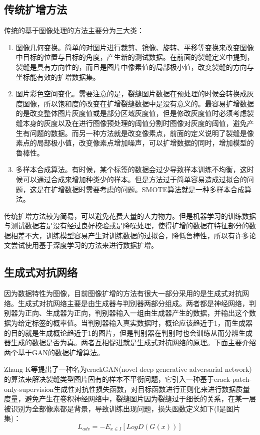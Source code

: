 \documentclass[a4paper,UTF8]{article}
\theoremstyle{definition}
\begin{document}
    \subsection{传统扩增方法}
    传统的基于图像处理的方法主要分为三大类：
    \begin{enumerate}[(1)]
    	\item 图像几何变换。简单的对图片进行裁剪、镜像、旋转、平移等变换来改变图像中目标的位置与目标的角度，产生新的测试数据。在前面的裂缝定义中提到，裂缝是具有方向性的，而且是图片中像素值的局部极小值，改变裂缝的方向与坐标能有效的扩增数据集。
    	\item 图片彩色空间变化。需要注意的是，裂缝图片数据在预处理的时候会转换成灰度图像，所以饱和度的改变在扩增裂缝数据中是没有意义的。最容易扩增数据的是改变整体图片灰度值或是部分区域灰度值，但是修改灰度值时必须考虑裂缝本身的灰度以及在进行图像预处理的阈值分割时图像对灰度的阈值，避免产生有问题的数据。而另一种方法就是改变像素点，前面的定义说明了裂缝是像素点的局部极小值，改变像素点增加噪声，可以扩增数据的同时，增加模型的鲁棒性。
    	\item 多样本合成算法。有时候，某个标签的数据会过少导致样本训练不均衡，这时候可以通过合成来增加种类少的样本。但是方法过于简单容易造成过拟合的问题，这是在扩增数据时需要考虑的问题。SMOTE算法\cite{17}就是一种多样本合成算法。
    \end{enumerate}
    传统扩增方法较为简易，可以避免花费大量的人力物力。但是机器学习的训练数据与测试数据若是没有经过良好校验或是降噪处理，使得扩增的数据在特征部分的数据相差不大，训练模型容易产生对训练数据的过拟合，降低鲁棒性，所以有许多论文尝试使用基于深度学习的方法来进行数据扩增。
    \subsection{生成式对抗网络}
    因为数据特性为图像，目前图像扩增的方法有很大一部分采用的是生成式对抗网络。生成式对抗网络主要是由生成器与判别器两部分组成。两者都是神经网络，判别器为正向、生成器为正向，判别器输入一组由生成器产生的数据，并输出这个数据为给定标签的概率值。当判别器输入真实数据时，概论应该趋近于1，而生成器的目的就是生成概论趋近于1的图片，但是判别器在判别时也会训练从而分辨生成器生成的数据是否为真。两者互相促进就是生成式对抗网络的原理。下面主要介绍两个基于GAN的数据扩增算法。
    
    Zhang K等提出了一种名为crackGAN(novel deep generative adversarial network)的算法\cite{14}来解决裂缝类型图片固有的样本不平衡问题，它引入一种基于crack-patch-only-supervision生成性对抗性损失函数，对目标函数进行正则化来进行数据质量度量，避免产生在卷积神经网络中，裂缝图片因为裂缝过于细长的关系，在某一层被识别为全部像素都是背景，导致训练出现问题，损失函数定义如下(I是图片集)：
    \begin{equation}
    L_{adv} = -E_{x \in I} [LogD(G(x))]
    \end{equation}
    
\end{document}
